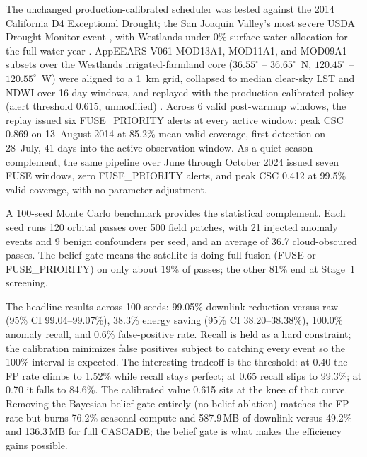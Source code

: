 \documentclass[11pt,letterpaper]{article}
\begin{document}
The unchanged production-calibrated scheduler was tested against the 2014 California D4 Exceptional Drought; the San Joaquin Valley's most severe USDA Drought Monitor event \cite{drought-monitor-2014}, with Westlands under 0\% surface-water allocation for the full water year \cite{westlands-zero-alloc}. AppEEARS V061 MOD13A1, MOD11A1, and MOD09A1 subsets over the Westlands irrigated-farmland core ($36.55^\circ$ -- $36.65^\circ$~N, $120.45^\circ$ -- $120.55^\circ$~W) were aligned to a 1~km grid, collapsed to median clear-sky LST and NDWI over 16-day windows, and replayed with the production-calibrated policy (alert threshold 0.615, unmodified) \cite{mod13a1,mod11a1,mod09a1,mod09-guide}. Across 6 valid post-warmup windows, the replay issued six FUSE\_PRIORITY alerts at every active window: peak CSC 0.869 on 13~August 2014 at 85.2\% mean valid coverage, first detection on 28~July, 41 days into the active observation window. As a quiet-season complement, the same pipeline over June through October 2024 issued seven FUSE windows, zero FUSE\_PRIORITY alerts, and peak CSC 0.412 at 99.5\% valid coverage, with no parameter adjustment.

A 100-seed Monte Carlo benchmark provides the statistical complement. Each seed runs 120 orbital passes over 500 field patches, with 21 injected anomaly events and 9 benign confounders per seed, and an average of 36.7 cloud-obscured passes. The belief gate means the satellite is doing full fusion (FUSE or FUSE\_PRIORITY) on only about 19\% of passes; the other 81\% end at Stage~1 screening.

The headline results across 100 seeds: 99.05\% downlink reduction versus raw (95\% CI 99.04--99.07\%), 38.3\% energy saving (95\% CI 38.20--38.38\%), 100.0\% anomaly recall, and 0.6\% false-positive rate. Recall is held as a hard constraint; the calibration minimizes false positives subject to catching every event so the 100\% interval is expected. The interesting tradeoff is the threshold: at 0.40 the FP rate climbs to 1.52\% while recall stays perfect; at 0.65 recall slips to 99.3\%; at 0.70 it falls to 84.6\%. The calibrated value 0.615 sits at the knee of that curve. Removing the Bayesian belief gate entirely (no-belief ablation) matches the FP rate but burns 76.2\% seasonal compute and 587.9\,MB of downlink versus 49.2\% and 136.3\,MB for full CASCADE; the belief gate is what makes the efficiency gains possible.
\end{document}

